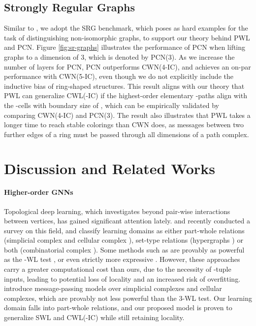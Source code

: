 \documentclass[letterpaper]{article} \usepackage{aaai24}  \usepackage{times}  \usepackage{helvet}  \usepackage{courier}  \usepackage[hyphens]{url}  \usepackage{graphicx} \urlstyle{rm} \def\UrlFont{\rm}  \usepackage{natbib}  \usepackage{caption} \frenchspacing  \setlength{\pdfpagewidth}{8.5in} \setlength{\pdfpageheight}{11in} \usepackage{algorithm}
\begin{document}
\subsection{Strongly Regular Graphs} \label{subsec:sr-graphs}
Similar to \cite{bodnar_weisfeiler_2021, bodnar_weisfeiler_2022, bouritsas_improving_2021}, we adopt the SRG benchmark, which poses as hard examples for the task of distinguishing non-isomorphic graphs, to support our theory behind PWL and PCN. Figure \ref{fig:sr-graphs} illustrates the performance of PCN when lifting graphs to a dimension of 3, which is denoted by PCN(3). As we increase the number of layers for PCN, PCN outperforms CWN(4-IC), and achieves an on-par performance with CWN(5-IC), even though we do not explicitly include the inductive bias of ring-shaped structures. This result aligns with our theory that PWL can generalize CWL(-IC) if the highest-order elementary -paths align with the -cells with boundary size of , which can be empirically validated by comparing CWN(4-IC) and PCN(3). The result also illustrates that PWL takes a longer time to reach stable colorings than CWN does, as messages between two further edges of a ring must be passed through all dimensions of a path complex.

\section{Discussion and Related Works}

\paragraph{Higher-order GNNs} Topological deep learning, which investigates beyond pair-wise interactions between vertices, has gained significant attention lately. \citeauthor{papillon_architectures_2023} and \citeauthor{hajij_topological_2023} recently conducted a survey on this field, and classify learning domains as either part-whole relations (simplicial complex \cite{bodnar_weisfeiler_2021, ebli_simplicial_2020, roddenberry_principled_2021} and cellular complex \cite{bodnar_weisfeiler_2022, giusti_cin_2023}), set-type relations (hypergraphs \cite{huang_unignn_2021, feng_hypergraph_2018, yadati_hypergcn_2019}) or both (combinatorial complex \cite{hajij_topological_2023}). Some methods such as \cite{maron_provably_2019, morris_weisfeiler_2019} are provably as powerful as the -WL test \cite{grohe_pebble_2012, grohe_descriptive_2017}, or even strictly more expressive \cite{morris_weisfeiler_2020}. However, these approaches carry a greater computational cost than ours, due to the necessity of -tuple inputs, leading to potential loss of locality and an increased risk of overfitting. \citeauthor{bodnar_weisfeiler_2021} introduce message-passing models over simplicial complexes and cellular complexes, which are provably not less powerful than the 3-WL test. Our learning domain falls into part-whole relations, and our proposed model is proven to generalize SWL \cite{bodnar_weisfeiler_2021} and CWL(-IC) \cite{bodnar_weisfeiler_2022} while still retaining locality.
\end{document}

